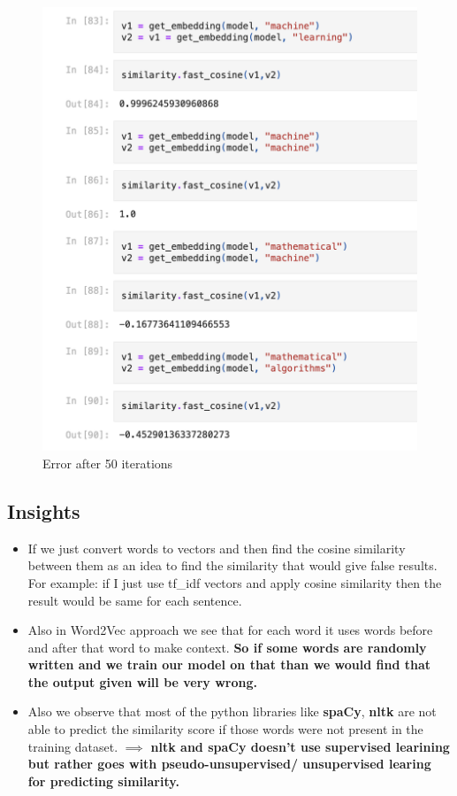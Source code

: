 \documentclass{article}
\begin{document}
\begin{figure}[htbp]
        \centering
        \includegraphics[width=0.5\linewidth]{task1_Untrained_demo.png}
        \caption{Error after 50 iterations}
        \label{fig:enter-label}
\end{figure}

\newpage
\subsection{Insights}
\begin{itemize}
    \item If we just convert words to vectors and then find the cosine similarity between them as an idea to find the similarity that would give false results.
    For example: if I just use tf\_idf vectors and apply cosine similarity then the result would be same for each sentence.
    \item Also in Word2Vec approach we see that for each word it uses words before and after that word to make context. \textbf{So if some words are randomly written and we train our model on that than we would find that the output given will be very wrong.}
    \item Also we observe that most of the python libraries like \textbf{spaCy}, \textbf{nltk} are not able to predict the similarity score if those words were not present in the training dataset. $\implies$ \textbf{nltk and spaCy doesn't use supervised learining but rather goes with pseudo-unsupervised/ unsupervised learing for predicting similarity.}
\end{itemize}
\end{document}
